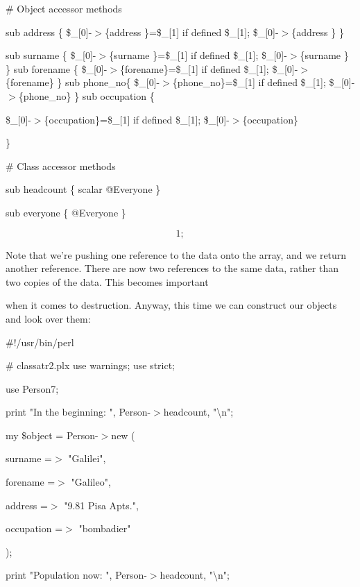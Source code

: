 \documentclass[a4paper,11pt]{book}
\begin{document}
\noindent 

\noindent \# Object accessor methods

\noindent sub address  \{ \$\_[0]-$>$\{address \}=\$\_[1] if defined \$\_[1]; \$\_[0]-$>$\{address \} \}

\noindent sub surname  \{ \$\_[0]-$>$\{surname \}=\$\_[1] if defined \$\_[1]; \$\_[0]-$>$\{surname \} \} sub forename \{ \$\_[0]-$>$\{forename\}=\$\_[1] if defined \$\_[1]; \$\_[0]-$>$\{forename\} \} sub phone\_no\{ \$\_[0]-$>$\{phone\_no\}=\$\_[1] if defined \$\_[1]; \$\_[0]-$>$\{phone\_no\} \} sub occupation  \{

\noindent \$\_[0]-$>$\{occupation\}=\$\_[1] if defined \$\_[1]; \$\_[0]-$>$\{occupation\}

\noindent \}

\noindent 

\noindent \# Class accessor methods

\noindent sub headcount \{ scalar @Everyone \}

\noindent sub everyone  \{ @Everyone \}

\noindent 

\[1;\] 


\noindent Note that we're pushing one reference to the data onto the array, and we return another reference. There are now two references to the same data, rather than two copies of the data. This becomes important

\noindent when it comes to destruction. Anyway, this time we can construct our objects and look over them:

\noindent 

\noindent \#!/usr/bin/perl

\noindent \# classatr2.plx use warnings; use strict;

\noindent use Person7;

\noindent 

\noindent print "In the beginning: ", Person-$>$headcount, "\textbackslash n";

\noindent my \$object = Person-$>$new (

\noindent surname =$>$ "Galilei",

\noindent forename =$>$ "Galileo",

\noindent address =$>$ "9.81 Pisa Apts.",

\noindent occupation =$>$ "bombadier"

\noindent );

\noindent print "Population now: ", Person-$>$headcount, "\textbackslash n";
\end{document}
